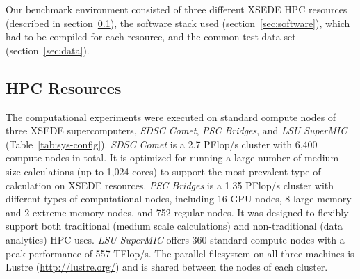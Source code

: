 \label{sec:system}
Our benchmark environment consisted of three different XSEDE \cite{xsede} HPC resources (described in section~\ref{sec:hpcresources}), the software stack used (section~\ref{sec:software}), which had to be compiled for each resource, and the common test data set (section~\ref{sec:data}).

\subsection{HPC Resources}
\label{sec:hpcresources}

The computational experiments were executed on standard compute nodes of three XSEDE \cite{xsede} supercomputers, \emph{SDSC Comet}, \emph{PSC Bridges}, and \emph{LSU SuperMIC} (Table~\ref{tab:sys-config}).
\emph{SDSC Comet} is a 2.7 PFlop/s cluster with 6,400 compute nodes in total. It is optimized for running a large number of medium-size calculations (up to 1,024 cores) to support the most prevalent type of calculation on XSEDE resources.
\emph{PSC Bridges} is a 1.35 PFlop/s cluster with different types of computational nodes, including 16 GPU nodes, 8 large memory and 2 extreme memory nodes, and 752 regular nodes.
It was designed to flexibly support both traditional (medium scale calculations) and non-traditional (data analytics) HPC uses.
\emph{LSU SuperMIC} offers 360 standard compute nodes with a peak performance of 557 TFlop/s.
The parallel filesystem on all three machines is Lustre (\url{http://lustre.org/}) and is shared between the nodes of each cluster.

